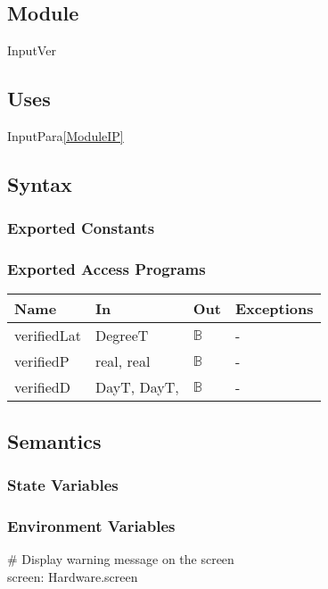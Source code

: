 \documentclass[12pt, titlepage]{article}
\begin{document}
\subsection{Module}
InputVer

\subsection{Uses}
InputPara\ref{ModuleIP}

\subsection{Syntax}

\subsubsection{Exported Constants}


\subsubsection{Exported Access Programs}

\begin{center}
\begin{tabular}{p{2cm} p{5cm} p{2cm} p{5cm}}
\hline
\textbf{Name} & \textbf{In} & \textbf{Out} & \textbf{Exceptions} \\
\hline 
verifiedLat & DegreeT& $\mathbb{B}$ & - \\
verifiedP &  real, real & $\mathbb{B}$ & - \\
verifiedD & DayT, DayT, & $\mathbb{B}$ & - \\
\hline
\end{tabular}
\end{center}


\subsection{Semantics}

\subsubsection{State Variables}



\subsubsection{Environment Variables}
\# Display warning message on the screen\\
screen: Hardware.screen\\
\end{document}
